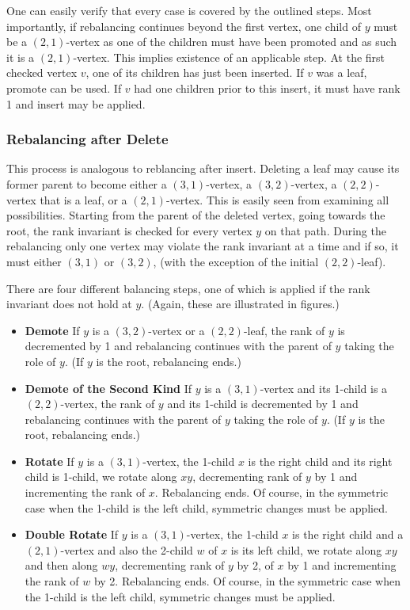 One can easily verify that every case is covered by the outlined steps. Most importantly, if rebalancing continues beyond the first vertex, one child of $y$ must be a $(2,1)$-vertex as one of the children must have been promoted and as such it is a $(2,1)$-vertex. This implies existence of an applicable step. At the first checked vertex $v$, one of its children has just been inserted. If $v$ was a leaf, promote can be used. If $v$ had one children prior to this insert, it must have rank 1 and insert may be applied. 



\subsubsection*{Rebalancing after Delete}

This process is analogous to reblancing after insert. Deleting a leaf may cause its former parent to become either a $(3,1)$-vertex, a $(3,2)$-vertex, a $(2,2)$-vertex that is a leaf, or a $(2,1)$-vertex. This is easily seen from examining all possibilities. Starting from the parent of the deleted vertex, going towards the root, the rank invariant is checked for every vertex $y$ on that path.  During the rebalancing only one vertex may violate the rank invariant at a time and if so, it must either $(3,1)$ or $(3,2)$, (with the exception of the initial $(2,2)$-leaf).

There are four different balancing steps, one of which is applied if the rank invariant does not hold at $y$. (Again, these are illustrated in figures.)
\begin{itemize}
	\item \textbf{Demote} If $y$ is a $(3,2)$-vertex or a $(2,2)$-leaf, the rank of $y$ is decremented by 1 and rebalancing continues with the parent of $y$ taking the role of $y$. (If $y$ is the root, rebalancing ends.)
	\item \textbf{Demote of the Second Kind} If $y$ is a $(3,1)$-vertex and its 1-child is a $(2,2)$-vertex, the rank of $y$ and its 1-child is decremented by 1 and rebalancing continues with the parent of $y$ taking the role of $y$. (If $y$ is the root, rebalancing ends.)
	\item \textbf{Rotate} If $y$ is a $(3,1)$-vertex, the 1-child $x$ is the right child and its right child is 1-child, we rotate along $xy$, decrementing rank of $y$ by 1 and incrementing the rank of $x$. Rebalancing ends. Of course, in the symmetric case when the 1-child is the left child, symmetric changes must be applied.
	\item \textbf{Double Rotate} If $y$ is a $(3,1)$-vertex, the 1-child $x$ is the right child and a $(2,1)$-vertex and also the 2-child $w$ of $x$ is its left child, we rotate along $xy$ and then along $wy$, decrementing rank of $y$ by 2, of $x$ by 1 and incrementing the rank of $w$ by 2. Rebalancing ends. Of course, in the symmetric case when the 1-child is the left child, symmetric changes must be applied.
\end{itemize}

